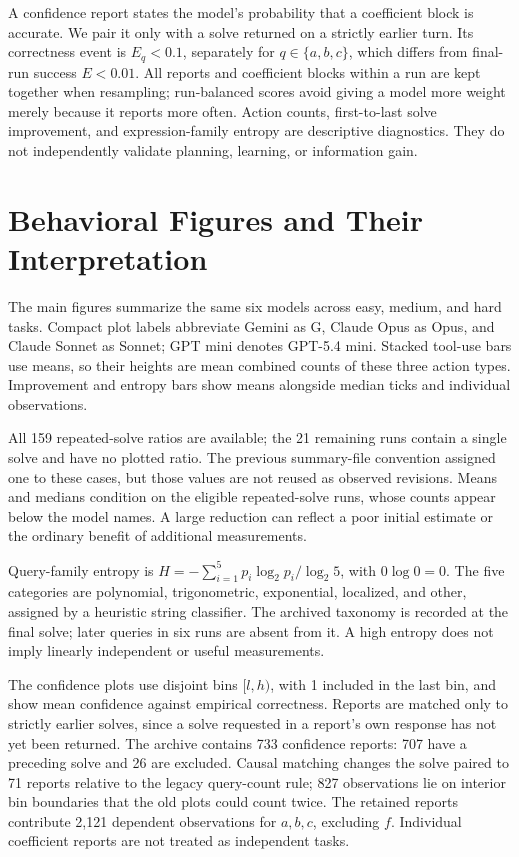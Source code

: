 \documentclass{article}
\begin{document}
A confidence report states the model's probability that a coefficient block
is accurate. We pair it only with a solve returned on a strictly earlier turn.
Its correctness event is \(E_q<0.1\), separately for
\(q\in\{a,b,c\}\), which differs from final-run success \(E<0.01\).
All reports and coefficient blocks within a run are
kept together when resampling; run-balanced scores avoid giving a model more
weight merely because it reports more often. Action counts, first-to-last solve
improvement, and expression-family entropy are descriptive diagnostics. They do
not independently validate planning, learning, or information gain.


\FloatBarrier

\section{Behavioral Figures and Their Interpretation}
\label{app:behavior}

The main figures summarize the same six models across easy, medium, and hard
tasks. Compact plot labels abbreviate Gemini as G, Claude Opus as Opus, and
Claude Sonnet as Sonnet; GPT mini denotes GPT-5.4 mini. Stacked tool-use bars use means, so their heights are
mean combined counts of these three action types. Improvement and entropy bars show means alongside
median ticks and individual observations.

All 159 repeated-solve ratios are available; the 21 remaining runs contain a
single solve and have no plotted ratio. The previous summary-file convention
assigned one to these cases, but those values are not reused as observed
revisions. Means and medians condition on the eligible repeated-solve runs,
whose counts appear below the model names. A large reduction can reflect a
poor initial estimate or the ordinary benefit of additional measurements.

Query-family entropy is
\(H=-\sum_{i=1}^5p_i\log_2p_i/\log_2 5\), with \(0\log0=0\).
The five categories are polynomial, trigonometric, exponential, localized, and
other, assigned by a heuristic string classifier. The archived taxonomy is
recorded at the final solve; later queries in six runs are absent from it.
A high entropy does not imply linearly independent or useful measurements.

The confidence plots use disjoint bins \([l,h)\), with 1 included in the last
bin, and show mean confidence against empirical correctness. Reports are
matched only to strictly earlier solves, since a solve requested in a report's
own response has not yet been returned. The archive contains 733 confidence reports: 707 have a preceding solve and
26 are excluded. Causal matching changes the solve paired to 71 reports relative
to the legacy query-count rule; 827 observations lie on interior bin boundaries
that the old plots could count twice. The retained reports contribute
2,121 dependent observations for \(a,b,c\), excluding \(f\). Individual
coefficient reports are not treated as independent tasks.
\end{document}
